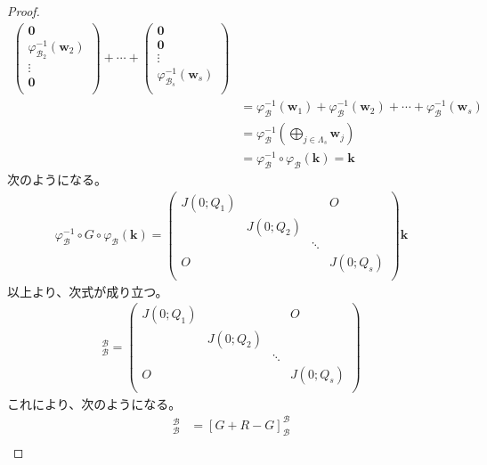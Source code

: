 \documentclass[dvipdfmx]{jsarticle}
\begin{document}
\begin{proof}
\begin{align*}
\begin{pmatrix}
\mathbf{0} \\
\varphi_{\mathcal{B}_{2}}^{- 1}\left( \mathbf{w}_{2} \right) \\
 \vdots \\
\mathbf{0} \\
\end{pmatrix} + \cdots + \begin{pmatrix}
\mathbf{0} \\
\mathbf{0} \\
 \vdots \\
\varphi_{\mathcal{B}_{s}}^{- 1}\left( \mathbf{w}_{s} \right) \\
\end{pmatrix} \\
&= \varphi_{\mathcal{B}}^{- 1}\left( \mathbf{w}_{1} \right) + \varphi_{\mathcal{B}}^{- 1}\left( \mathbf{w}_{2} \right) + \cdots + \varphi_{\mathcal{B}}^{- 1}\left( \mathbf{w}_{s} \right) \\
&= \varphi_{\mathcal{B}}^{- 1}\left( \bigoplus_{j \in \varLambda_{s}} \mathbf{w}_{j} \right) \\
&= \varphi_{\mathcal{B}}^{- 1} \circ \varphi_{\mathcal{B}}\left( \mathbf{k} \right) = \mathbf{k}
\end{align*}
次のようになる。
\begin{align*}
\varphi_{\mathcal{B}}^{- 1} \circ G \circ \varphi_{\mathcal{B}}\left( \mathbf{k} \right) = \begin{pmatrix}
J\left( 0;Q_{1} \right) & \  & \  & O \\
\  & J\left( 0;Q_{2} \right) & \  & \  \\
\  & \  & \ddots & \  \\
O & \  & \  & J\left( 0;Q_{s} \right) \\
\end{pmatrix}\mathbf{k}
\end{align*}
以上より、次式が成り立つ。
\begin{align*}
[G]_{\mathcal{B}}^{\mathcal{B}} = \begin{pmatrix}
J\left( 0;Q_{1} \right) & \  & \  & O \\
\  & J\left( 0;Q_{2} \right) & \  & \  \\
\  & \  & \ddots & \  \\
O & \  & \  & J\left( 0;Q_{s} \right) \\
\end{pmatrix}
\end{align*}
これにより、次のようになる。
\begin{align*}
[R]_{\mathcal{B}}^{\mathcal{B}} &= [G + R - G]_{\mathcal{B}}^{\mathcal{B}} \\

\end{align*}
\end{proof}
\end{document}
